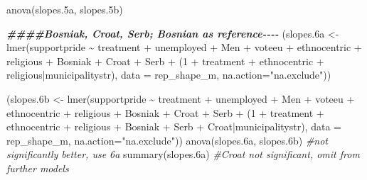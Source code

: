 \documentclass[
]{article}
\newenvironment{Shaded}{\begin{snugshade}}{\end{snugshade}}
\newcommand{\AttributeTok}[1]{\textcolor[rgb]{0.77,0.63,0.00}{#1}}
\newcommand{\CommentTok}[1]{\textcolor[rgb]{0.56,0.35,0.01}{\textit{#1}}}
\newcommand{\DecValTok}[1]{\textcolor[rgb]{0.00,0.00,0.81}{#1}}
\newcommand{\DocumentationTok}[1]{\textcolor[rgb]{0.56,0.35,0.01}{\textbf{\textit{#1}}}}
\newcommand{\FloatTok}[1]{\textcolor[rgb]{0.00,0.00,0.81}{#1}}
\newcommand{\FunctionTok}[1]{\textcolor[rgb]{0.00,0.00,0.00}{#1}}
\newcommand{\NormalTok}[1]{#1}
\newcommand{\OtherTok}[1]{\textcolor[rgb]{0.56,0.35,0.01}{#1}}
\newcommand{\SpecialCharTok}[1]{\textcolor[rgb]{0.00,0.00,0.00}{#1}}
\newcommand{\StringTok}[1]{\textcolor[rgb]{0.31,0.60,0.02}{#1}}
\begin{document}
\begin{Shaded}
\begin{Highlighting}[]
\FunctionTok{anova}\NormalTok{(slopes}\FloatTok{.5}\NormalTok{a, slopes}\FloatTok{.5}\NormalTok{b) }

\DocumentationTok{\#\#\#\#Bosniak, Croat, Serb; Bosnian as reference{-}{-}{-}{-}}
\NormalTok{(slopes}\FloatTok{.6}\NormalTok{a }\OtherTok{\textless{}{-}} \FunctionTok{lmer}\NormalTok{(supportpride }\SpecialCharTok{\textasciitilde{}}\NormalTok{ treatment }\SpecialCharTok{+}\NormalTok{ unemployed }\SpecialCharTok{+}\NormalTok{ Men }\SpecialCharTok{+}\NormalTok{ voteeu }\SpecialCharTok{+}\NormalTok{ ethnocentric }\SpecialCharTok{+}\NormalTok{ religious }\SpecialCharTok{+} 
\NormalTok{                     Bosniak }\SpecialCharTok{+}\NormalTok{ Croat }\SpecialCharTok{+}\NormalTok{ Serb }\SpecialCharTok{+}\NormalTok{ (}\DecValTok{1} \SpecialCharTok{+}\NormalTok{ treatment }\SpecialCharTok{+}\NormalTok{ ethnocentric }\SpecialCharTok{+}\NormalTok{ religious}\SpecialCharTok{|}\NormalTok{municipalitystr),}
                   \AttributeTok{data =}\NormalTok{ rep\_shape\_m, }\AttributeTok{na.action=}\StringTok{"na.exclude"}\NormalTok{))}

\NormalTok{(slopes}\FloatTok{.6}\NormalTok{b }\OtherTok{\textless{}{-}} \FunctionTok{lmer}\NormalTok{(supportpride }\SpecialCharTok{\textasciitilde{}}\NormalTok{ treatment }\SpecialCharTok{+}\NormalTok{ unemployed }\SpecialCharTok{+}\NormalTok{ Men }\SpecialCharTok{+}\NormalTok{ voteeu }\SpecialCharTok{+}\NormalTok{ ethnocentric }\SpecialCharTok{+}\NormalTok{ religious }\SpecialCharTok{+} 
\NormalTok{                     Bosniak }\SpecialCharTok{+}\NormalTok{ Croat }\SpecialCharTok{+}\NormalTok{ Serb }\SpecialCharTok{+}\NormalTok{ (}\DecValTok{1} \SpecialCharTok{+}\NormalTok{ treatment }\SpecialCharTok{+}\NormalTok{ ethnocentric }\SpecialCharTok{+}\NormalTok{ religious }\SpecialCharTok{+}\NormalTok{ Bosniak }\SpecialCharTok{+}\NormalTok{ Serb }\SpecialCharTok{+}\NormalTok{ Croat}\SpecialCharTok{|}\NormalTok{municipalitystr),}
                   \AttributeTok{data =}\NormalTok{ rep\_shape\_m, }\AttributeTok{na.action=}\StringTok{"na.exclude"}\NormalTok{))}
\FunctionTok{anova}\NormalTok{(slopes}\FloatTok{.6}\NormalTok{a, slopes}\FloatTok{.6}\NormalTok{b) }\CommentTok{\#not significantly better, use 6a}
\FunctionTok{summary}\NormalTok{(slopes}\FloatTok{.6}\NormalTok{a) }\CommentTok{\#Croat not significant, omit from further models}


\end{Highlighting}
\end{Shaded}
\end{document}
